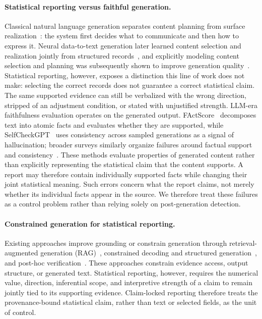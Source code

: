 \documentclass[10pt,twocolumn]{article}
\begin{document}
\paragraph{Statistical reporting versus faithful generation.} Classical natural language generation separates content planning from surface realization~\citep{ref_reiter_dale,ref_gatt_krahmer}: the system first decides what to communicate and then how to express it. Neural data-to-text generation later learned content selection and realization jointly from structured records~\citep{ref_lebret,ref_wiseman}, and explicitly modeling content selection and planning was subsequently shown to improve generation quality~\citep{ref_puduppully}. Statistical reporting, however, exposes a distinction this line of work does not make: selecting the correct records does not guarantee a correct statistical claim. The same supported evidence can still be verbalized with the wrong direction, stripped of an adjustment condition, or stated with unjustified strength. LLM-era faithfulness evaluation operates on the generated output. FActScore~\citep{ref_factscore} decomposes text into atomic facts and evaluates whether they are supported, while SelfCheckGPT~\citep{ref_self_check} uses consistency across sampled generations as a signal of hallucination; broader surveys similarly organize failures around factual support and consistency~\citep{ref_hallucination_survey,ref_huang_hallucination}. These methods evaluate properties of generated content rather than explicitly representing the statistical claim that the content supports. A report may therefore contain individually supported facts while changing their joint statistical meaning. Such errors concern what the report claims, not merely whether its individual facts appear in the source. We therefore treat these failures as a control problem rather than relying solely on post-generation detection.
\paragraph{Constrained generation for statistical reporting.}
Existing approaches improve grounding or constrain generation through retrieval-augmented generation (RAG)~\citep{ref_rag},
constrained decoding and structured generation~\citep{ref_outlines,ref_guidance}, and post-hoc verification~\citep{ref_self_check}.
These approaches constrain evidence access, output structure, or generated text. Statistical reporting, however, requires the numerical value, direction, inferential scope, and interpretive strength of a claim to remain jointly tied to its supporting evidence. Claim-locked reporting therefore treats the provenance-bound statistical claim, rather than text or selected fields, as the
unit of control.
\end{document}
